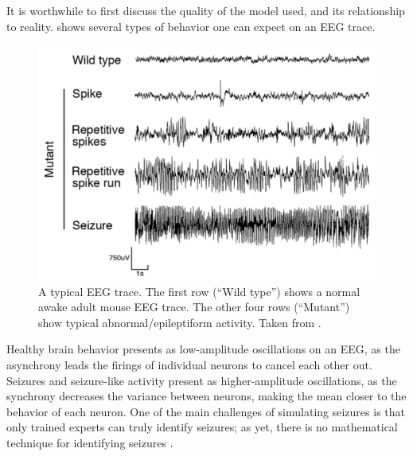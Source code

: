 It is worthwhile to first discuss the quality of the model used, and its relationship to reality.
 shows several types of behavior one can expect on an EEG trace.
\begin{figure}[ht]
  \centering
  \includegraphics[width=\columnwidth]{figure/eeg}
  \caption[Typical EEG trace]{A typical EEG trace.
    The first row (``Wild type'') shows a normal awake adult mouse EEG trace.
    The other four rows (``Mutant'') show typical abnormal/epileptiform activity.
    Taken from \cite{Ljungberg2009}.
  }
  \label{fig:eeg}
\end{figure}
Healthy brain behavior presents as low-amplitude oscillations on an EEG, as the asynchrony leads the firings of individual neurons to cancel each other out.
Seizures and seizure-like activity present as higher-amplitude oscillations, as the synchrony decreases the variance between neurons, making the mean closer to the behavior of each neuron.
One of the main challenges of simulating seizures is that only trained experts can truly identify seizures; as yet, there is no mathematical technique for identifying seizures \cite{Kandel2013}.

